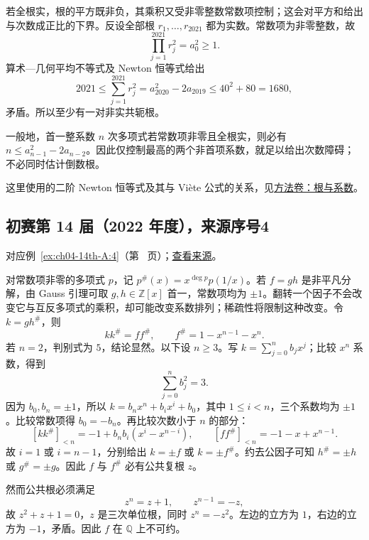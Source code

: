 \documentclass[UTF8,12pt,a4paper,fontset=fandol]{ctexart}
\begin{document}
\begin{solve}

若全根实，根的平方既非负，其乘积又受非零整数常数项控制；这会对平方和给出与次数成正比的下界。反设全部根 $r_1,\ldots,r_{2021}$ 都为实数。常数项为非零整数，故
\[
\prod_{j=1}^{2021}r_j^2=a_0^2\geq1.
\]
算术---几何平均不等式及 Newton 恒等式给出
\[
2021\leq\sum_{j=1}^{2021}r_j^2
=a_{2020}^2-2a_{2019}
\leq40^2+80=1680,
\]
矛盾。所以至少有一对非实共轭根。

\end{solve}

\begin{remark}[方法与条件]

一般地，首一整系数 $n$ 次多项式若常数项非零且全根实，则必有 $n\leq a_{n-1}^2-2a_{n-2}$。因此仅控制最高的两个非首项系数，就足以给出次数障碍；不必同时估计倒数根。

这里使用的二阶 Newton 恒等式及其与 Viète 公式的关系，见\hyperref[app:algebra-roots]{方法卷：根与系数}。

\end{remark}

\subsection{初赛第 14 届（2022 年度），来源序号4}\label{ans:ch04-14th-A:4}\label{pr:ch04-14th-A:4}

对应例~\ref{ex:ch04-14th-A:4}（第~\pageref{ex:ch04-14th-A:4} 页）；\href{https://github.com/lzxcr/cmc-mathematics/blob/64916fa1fdbc3e444a652eca204d5669058ee321/src/problems/preliminary/14/04.md}{查看来源}。

\begin{solve}

对常数项非零的多项式 $p$，记 $p^\#(x)=x^{\deg p}p(1/x)$。若 $f=gh$ 是非平凡分解，由 Gauss 引理可取 $g,h\in\mathbb Z[x]$ 首一，常数项均为 $\pm1$。翻转一个因子不会改变它与互反多项式的乘积，却可能改变系数排列；稀疏性将限制这种改变。令 $k=gh^\#$，则
\[
kk^\#=ff^\#,
\qquad
f^\#=1-x^{n-1}-x^n.
\]
若 $n=2$，判别式为 $5$，结论显然。以下设 $n\geq3$。写 $k=\sum_{j=0}^n b_jx^j$；比较 $x^n$ 系数，得到
\[
\sum_{j=0}^n b_j^2=3.
\]
因为 $b_0,b_n=\pm1$，所以 $k=b_nx^n+b_ix^i+b_0$，其中 $1\leq i<n$，三个系数均为 $\pm1$。比较常数项得 $b_0=-b_n$。再比较次数小于 $n$ 的部分：
\[
[kk^\#]_{<n}=-1+b_nb_i(x^i-x^{n-i}),
\qquad
[ff^\#]_{<n}=-1-x+x^{n-1}.
\]
故 $i=1$ 或 $i=n-1$，分别给出 $k=\pm f$ 或 $k=\pm f^\#$。约去公因子可知 $h^\#=\pm h$ 或 $g^\#=\pm g$。因此 $f$ 与 $f^\#$ 必有公共复根 $z$。

然而公共根必须满足
\[
z^n=z+1,\qquad z^{n-1}=-z,
\]
故 $z^2+z+1=0$，$z$ 是三次单位根，同时 $z^n=-z^2$。左边的立方为 $1$，右边的立方为 $-1$，矛盾。因此 $f$ 在 $\mathbb Q$ 上不可约。

\end{solve}
\end{document}
